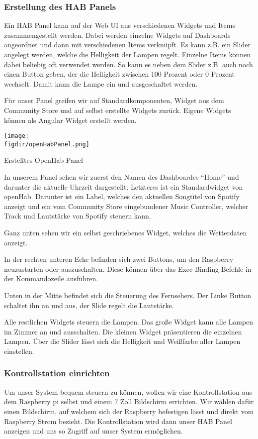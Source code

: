 		\subsubsection{Erstellung des HAB Panels}
		Ein HAB Panel kann auf der Web UI aus verschiedenen Widgets und Items zusammengestellt werden. Dabei werden einzelne Widgets auf Dashboards angeordnet und dann mit verschiedenen Items verknüpft. Es kann z.B. ein Slider angelegt werden, welche die Helligkeit der Lampen regelt. Einzelne Items können dabei beliebig oft verwendet werden. So kann es neben dem Slider z.B. auch noch einen Button geben, der die Helligkeit zwischen 100 Prozent oder 0 Prozent wechselt. Damit kann die Lampe ein und ausgeschaltet werden.
		
		Für unser Panel greifen wir auf Standardkomponenten, Widget aus dem Community Store und auf selbst erstellte Widgets zurück. Eigene Widgets können als Angular Widget erstellt werden.
		
	\begin{minipage}{\textwidth}
		\centering
		\captionsetup{type=figure}
		\texttt{[image: \\figdir/openHabPanel.png]}
		\caption{Erstelltes OpenHab Panel \label{fig:activity-diagram}}
	\end{minipage}
		
		In unserem Panel sehen wir zuerst den Namen des Dashboardes "`Home"' und darunter die aktuelle Uhrzeit dargestellt. Letzteres ist ein Standardwidget von openHab.
		Darunter ist ein Label, welches den aktuellen Songtitel von Spotify anzeigt und ein vom Community Store eingebundener Music Controller, welcher Track und Lautstärke von Spotify steuern kann.

		Ganz unten sehen wir ein selbst geschriebenes Widget, welches die Wetterdaten anzeigt.

		In der rechten unteren Ecke befinden sich zwei Buttons, um den Raspberry neuzustarten oder auszuschalten. Diese können über das Exec Binding Befehle in der Kommandozeile ausführen.
		
		Unten in der Mitte befindet sich die Steuerung des Fernsehers. Der Linke Button schaltet ihn an und aus, der Slide regelt die Lautstärke.
		
		Alle restlichen Widgets steuern die Lampen. Das große Widget kann alle Lampen im Zimmer an und ausschalten. Die kleinen Widget präsentieren die einzelnen Lampen. Über die Slider lässt sich die Helligkeit und Weißfarbe aller Lampen einstellen.
		
		\subsubsection{Kontrollstation einrichten}
		Um unser System bequem steuern zu können, wollen wir eine Kontrollstation aus dem Raspberry pi selbst und einem 7 Zoll Bildschirm errichten. Wir wählen dafür einen Bildschirm, auf welchem sich der Raspberry befestigen lässt und direkt vom Raspberry Strom bezieht.
		Die Kontrollstation wird dann unser HAB Panel anzeigen und uns so Zugriff auf unser System ermöglichen.

